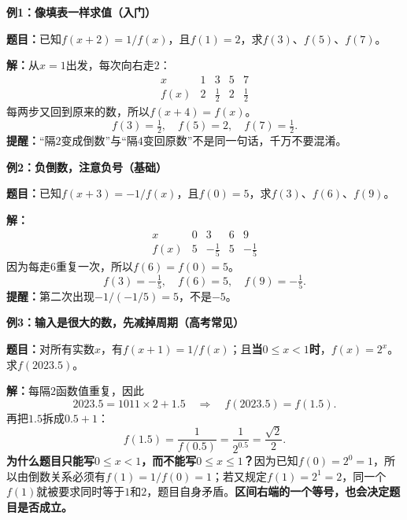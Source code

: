 \clearpage
\begin{examplebox}
\textbf{\textcolor{CExample}{例1：像填表一样求值（入门）}}



\textbf{题目：}已知$f(x+2)=1/f(x)$，且$f(1)=2$，求$f(3)$、$f(5)$、$f(7)$。

\textbf{解：}从$x=1$出发，每次向右走$2$：
\[
\begin{array}{c|cccc}
 x&1&3&5&7\\ \hline
 f(x)&2&\frac12&2&\frac12
\end{array}
\]
每两步又回到原来的数，所以$f(x+4)=f(x)$。
\[
\boxed{f(3)=\tfrac12,\quad f(5)=2,\quad f(7)=\tfrac12}.
\]
\textbf{提醒：}“隔$2$变成倒数”与“隔$4$变回原数”不是同一句话，千万不要混淆。

\medskip

\end{examplebox}
\clearpage
\begin{examplebox}
\textbf{\textcolor{CExample}{例2：负倒数，注意负号（基础）}}



\textbf{题目：}已知$f(x+3)=-1/f(x)$，且$f(0)=5$，求$f(3)$、$f(6)$、$f(9)$。

\textbf{解：}
\[
\begin{array}{c|cccc}
 x&0&3&6&9\\ \hline
 f(x)&5&-\frac15&5&-\frac15
\end{array}
\]
因为每走$6$重复一次，所以$f(6)=f(0)=5$。
\[
\boxed{f(3)=-\tfrac15,\quad f(6)=5,\quad f(9)=-\tfrac15}.
\]
\textbf{提醒：}第二次出现$-1/(-1/5)=5$，不是$-5$。

\medskip

\end{examplebox}
\clearpage
\begin{examplebox}
\textbf{\textcolor{CExample}{例3：输入是很大的数，先减掉周期（高考常见）}}



\textbf{题目：}对所有实数$x$，有$f(x+1)=1/f(x)$；且\textbf{当$0\le x<1$时}，$f(x)=2^x$。求$f(2023.5)$。

\textbf{解：}每隔$2$函数值重复，因此
\[
 2023.5=1011\times 2+1.5
 \quad\Longrightarrow\quad f(2023.5)=f(1.5).
\]
再把$1.5$拆成$0.5+1$：
\[
 f(1.5)=\frac1{f(0.5)}=\frac1{2^{0.5}}=
 \boxed{\frac{\sqrt2}{2}}.
\]
\textbf{为什么题目只能写$0\le x<1$，而不能写$0\le x\le1$？}因为已知$f(0)=2^0=1$，所以由倒数关系必须有$f(1)=1/f(0)=1$；若又规定$f(1)=2^1=2$，同一个$f(1)$就被要求同时等于$1$和$2$，题目自身矛盾。\textbf{区间右端的一个等号，也会决定题目是否成立。}

\medskip

\end{examplebox}

